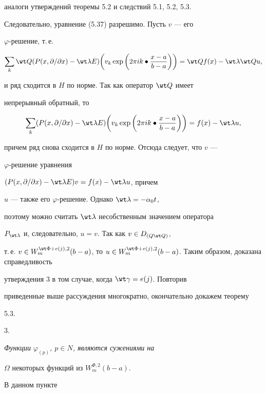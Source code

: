 \begin{pf}
аналоги утверждений теоремы 5.2 и следствий 5.1, 5.2, 5.3. 


Следовательно, уравнение (5.37) разрешимо. Пусть $v$ --- его 


$\varphi$-решение, т.\,е. 


$$ 


\sum_k\wt Q(P(x,\partial/\partial x)-\wt\lambda E) 


\bigg(v_k\exp\bigg(2\pi i k\bullet\frac{x-a}{b-a}\bigg)\bigg)= 


\wt Q f(x)-\wt\lambda\wt Q u, 


$$ 


и ряд сходится в $H$ по норме. Так как оператор $\wt Q$ имеет 


непрерывный обратный, то 


$$ 


\sum_k(P(x,\partial/\partial x)-\wt\lambda E) 


\bigg(v_k\exp\bigg(2\pi i k\bullet\frac{x-a}{b-a}\bigg)\bigg)= 


f(x)-\wt\lambda u, 


$$ 


причем ряд снова сходится в $H$ по норме. Отсюда следует, что $v$ --- 


$\varphi$-решение уравнения 


$(P(x,\partial/\partial x)-\wt\lambda E)v=f(x)-\wt\lambda u$, причем 


$u$ --- также его $\varphi$-решение. Однако $\wt\lambda=-\alpha_0t$, 


поэтому можно считать $\wt\lambda$ несобственным значением оператора 


$P_{\wt\lambda}$ и, следовательно, $u=v$. Так как $v\in D_{(Q\wt Q)}$, 


т.\,е. $v\in W^{\wt\Phi+e(j),2}_m(b-a)$, то $u\in 


W^{\wt\Phi+e(j),2}_m(b-a)$. Таким образом, доказана справедливость 


утверждения 3 в том случае, когда $\wt\gamma=e(j)$. Повторив 


приведенные выше рассуждения многократно, окончательно докажем теорему 


5.3. 


\end{pf} 


 


3. {\it Функции $\varphi_{(p)}$, $p\in N$, являются сужениями на 


$\Omega$ некоторых функций из $W^{\Phi,2}_m(b-a)$.} В данном пункте 



